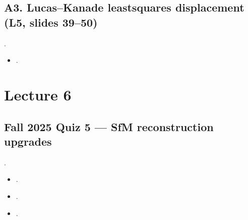 \documentclass[letterpaper,11pt,english,openany,oneside]{jupyterBook}
\begin{document}
\subsection{A3. Lucas–Kanade least\sphinxhyphen{}squares displacement (L5, slides 39–50)}
\label{\detokenize{reference/quiz-index:a3-lucaskanade-least-squares-displacement-l5-slides-3950}}
\sphinxAtStartPar
{} . 
\begin{itemize}
\item {}
\sphinxAtStartPar
{\hyperref[\detokenize{lectures/lecture05/quiz-workbook:quiz-a3-q1}]{}}.

\end{itemize}


\section{Lecture 6}
\label{\detokenize{reference/quiz-index:lecture-6}}
\sphinxAtStartPar
{}


\subsection{Fall 2025 Quiz 5 — SfM reconstruction upgrades}
\label{\detokenize{reference/quiz-index:fall-2025-quiz-5-sfm-reconstruction-upgrades}}
\sphinxAtStartPar
{} .
\begin{itemize}
\item {}
\sphinxAtStartPar
{\hyperref[\detokenize{lectures/lecture06/quiz-workbook:quiz-12-q1}]{}}.

\item {}
\sphinxAtStartPar
{\hyperref[\detokenize{lectures/lecture06/quiz-workbook:quiz-12-q2}]{}}.

\item {}
\sphinxAtStartPar
{\hyperref[\detokenize{lectures/lecture06/quiz-workbook:quiz-12-q3}]{}}.

\end{itemize}
\end{document}
